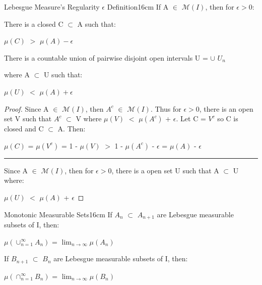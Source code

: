     \vspace{0.5cm}



    \begin{wtheorem}{Lebesgue Measure's Regularity $\epsilon$ Definition}{16cm}
        If A $\in$ $\mathcal{M}(I)$, then for $\epsilon > 0$:

        \hspace{0.5cm}
        There is a closed C $\subset$ A such that:

        \hspace{1cm}
        $\mu(C)$ $>$ $\mu(A) - \epsilon$

        \hspace{0.5cm}
        There is a countable union of pairwise disjoint open
        intervals U = $\cup$ $U_n$
        
        \hspace{0.5cm}
        where A $\subset$ U such that:

        \hspace{1cm}
        $\mu(U)$ $<$ $\mu(A) + \epsilon$
    \end{wtheorem}

    \begin{proof}
        Since A $\in$ $\mathcal{M}(I)$, then $A^c$ $\in$ $\mathcal{M}(I)$.
        Thus for $\epsilon > 0$, there is an open set V such that
        $A^c$ $\subset$ V where $\mu(V)$ $<$ $\mu(A^c)$ + $\epsilon$.
        Let C = $V^c$ so C is closed and C $\subset$ A. Then:

        \hspace{0.5cm}
        $\mu(C)$
        = $\mu(V^c)$
        = 1 - $\mu(V)$
        $>$ 1 - $\mu(A^c)$ - $\epsilon$
        = $\mu(A)$ - $\epsilon$

        \rule[0.1cm]{15.2cm}{0.01cm}

        Since A $\in$ $\mathcal{M}(I)$, then for $\epsilon > 0$,
        there is a open set U such that A $\subset$ U where:

        \hspace{0.5cm}
        $\mu(U)$ $<$ $\mu(A)$ + $\epsilon$
    \end{proof}

    \vspace{0.5cm}



    \begin{wtheorem}{Monotonic Measurable Sets}{16cm}
        If $A_n$ $\subset$ $A_{n+1}$ are Lebesgue measurable subsets of I, then:

        \hspace{0.5cm}
        $\mu(\cup_{n=1}^{\infty} A_n)$
        = $\lim_{n \rightarrow \infty} \mu(A_n)$

        If $B_{n+1}$ $\subset$ $B_n$ are Lebesgue measurable subsets of I, then:

        \hspace{0.5cm}
        $\mu(\cap_{n=1}^{\infty} B_n)$
        = $\lim_{n \rightarrow \infty} \mu(B_n)$
    \end{wtheorem}

